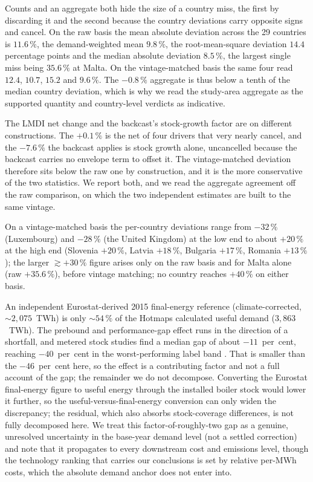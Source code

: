 Counts and an aggregate both hide the size of a country miss, the first by discarding it
and the second because the country deviations carry opposite signs and cancel. On the raw
basis the mean absolute deviation across the 29 countries is $11.6\,\%$, the
demand-weighted mean $9.8\,\%$, the root-mean-square deviation $14.4$ percentage points
and the median absolute deviation $8.5\,\%$, the largest single miss being $35.6\,\%$ at
Malta. On the vintage-matched basis the same four read $12.4$, $10.7$, $15.2$ and
$9.6\,\%$. The $-0.8\,\%$ aggregate is thus below a tenth of the median country
deviation, which is why we read the study-area aggregate as the supported quantity and
country-level verdicts as indicative.

The LMDI net change and the backcast's stock-growth factor are on different
constructions. The $+0.1\,\%$ is the net of four drivers that very nearly cancel, and the $-7.6\,\%$ the backcast applies is stock growth alone, uncancelled because the
backcast carries no envelope term to offset it. The vintage-matched deviation therefore
sits below the raw one by construction, and it is the more conservative of the two statistics. We report both, and we read the aggregate
agreement off the raw comparison, on which the two independent estimates are built to the
same vintage.

On a vintage-matched basis the per-country deviations range from $-32\,\%$ (Luxembourg) and $-28\,\%$
(the United Kingdom) at the low end to about $+20\,\%$ at the high end (Slovenia
$+20\,\%$, Latvia $+18\,\%$, Bulgaria $+17\,\%$, Romania $+13\,\%$); the larger
$\gtrsim+30\,\%$ figure arises only on the raw basis and for Malta alone (raw
$+35.6\,\%$), before vintage matching; no country reaches $+40\,\%$ on either basis.

An independent Eurostat-derived 2015 final-energy reference (climate-corrected,
$\sim 2{,}075$~TWh) is only $\sim 54\,\%$ of the Hotmaps
calculated useful demand ($3{,}863$~TWh). The prebound and performance-gap effect runs in the direction of a shortfall, and metered stock studies find a median gap of about $-11$~per~cent, reaching $-40$~per~cent in the worst-performing label band \citep{Cozza2019Measuring}. That is smaller than the $-46$~per~cent here, so the effect is a contributing factor and not a full account of the gap; the remainder we do not decompose. Converting the Eurostat final-energy
figure to useful energy through the installed boiler stock would lower it further, so the useful-versus-final-energy conversion can only widen the discrepancy; the residual, which also absorbs stock-coverage
differences, is not fully decomposed here. We treat this factor-of-roughly-two gap as
a genuine, unresolved uncertainty in the base-year demand level (not a settled
correction) and note that it propagates to every downstream cost and emissions level,
though the technology ranking that carries our conclusions is set by relative per-MWh costs, which the absolute demand anchor does not enter into.

